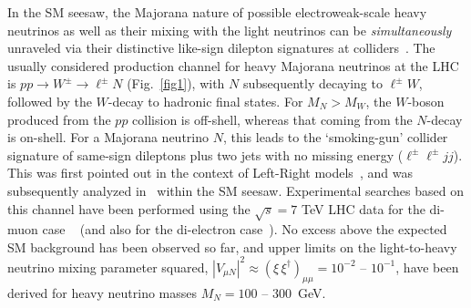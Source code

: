 \documentclass[reprint,prl,twocolumn,superscriptaddress,showpacs,nofootinbib,floatfix,preprintnumbers]{revtex4-1}
\begin{document}
In the  SM seesaw, the  Majorana nature of  possible electroweak-scale
heavy neutrinos as well as their mixing with the light neutrinos 
can  be {\it simultaneously} unraveled via their distinctive like-sign
dilepton   signatures   at   colliders~\cite{atre}.  
The  usually considered production  channel for heavy
Majorana neutrinos  at the LHC is  $pp\to W^\pm \to  \ell^\pm N$ (Fig.~\ref{fig1}), 
with $N$ subsequently  decaying to $\ell^\pm W$, followed  by the $W$-decay
to hadronic final  states.  For $M_N>M_W$, 
the  $W$-boson produced  from the  $pp$  collision is
off-shell, whereas that  coming from the $N$-decay  is on-shell. For a
Majorana  neutrino  $N$,  this  leads to  the  `smoking-gun'  collider
signature of same-sign dileptons plus  two jets with no missing energy
($\ell^\pm\ell^\pm  jj$).   This was  first  pointed  out
 in the context of Left-Right models~\cite{KS}, and        was        
subsequently        analyzed
in~\cite{APZPC,datta,theory-LL,BLP}    within     the    SM    seesaw.
Experimental searches based on this channel have been performed 
using the $\sqrt s=7$ TeV LHC data for  the di-muon case
~\cite{ATLAS-LL, CMS-LL} (and also for the  di-electron case~\cite{CMS-LL}).  
No  excess above the
expected SM background  has been observed so far,  and upper limits on
the light-to-heavy  neutrino mixing parameter  squared, $|V_{\mu N}|^2
\approx (\xi\, \xi^\dagger)_{\mu  \mu}=10^{-2}$ -- $10^{-1}$, have been
derived for heavy neutrino masses $M_N = 100$ -- 300~GeV.
\end{document}
